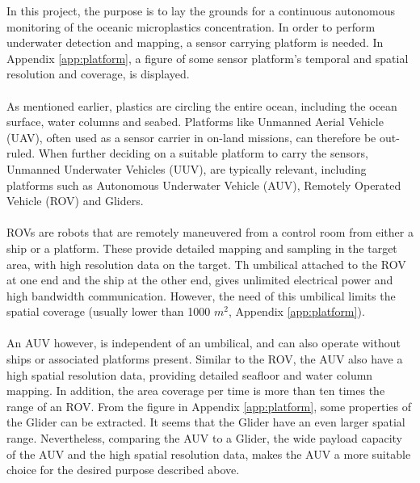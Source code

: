 In this project, the purpose is to lay the grounds for a continuous autonomous monitoring of the oceanic microplastics concentration. In order to perform underwater detection and mapping, a sensor carrying platform is needed. %
In Appendix \ref{app:platform}, a figure of some sensor platform's temporal and spatial resolution and coverage, is displayed.
\\\\
As mentioned earlier, plastics are circling the entire ocean, including the ocean surface, water columns and seabed. Platforms like Unmanned Aerial Vehicle (UAV), often used as a sensor carrier in on-land missions, can therefore be out-ruled. When further deciding on a suitable platform to carry the sensors, Unmanned Underwater Vehicles (UUV), are typically relevant, including platforms such as Autonomous Underwater Vehicle (AUV), Remotely Operated Vehicle (ROV) and Gliders.
\\\\
ROVs are robots that are remotely maneuvered from a control room from either a ship or a platform. These provide detailed mapping and sampling in the target area, with high resolution data on the target. Th umbilical attached to the ROV at one end and the ship at the other end, gives unlimited electrical power and high bandwidth communication. However, the need of this umbilical limits the spatial coverage (usually lower than 1000 $m^2$, Appendix \ref{app:platform}). 
\\\\
An AUV however, is independent of an umbilical, and can also operate without ships or associated platforms present. Similar to the ROV, the AUV also have a high spatial resolution data, providing detailed seafloor and water column mapping. In addition, the area coverage per time is more than ten times the range of an ROV. From the figure in Appendix \ref{app:platform}, some properties of the Glider can be extracted. It seems that the Glider have an even larger spatial range. Nevertheless, comparing the AUV to a Glider, the wide payload capacity of the AUV and the high spatial resolution data, makes the AUV a more suitable choice for the desired purpose described above. 
